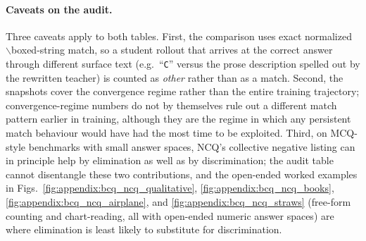 \paragraph{Caveats on the audit.} Three caveats apply to both tables. First, the comparison uses exact normalized $\backslash$boxed-string match, so a student rollout that arrives at the correct answer through different surface text (e.g.\ ``\texttt{C}'' versus the prose description spelled out by the rewritten teacher) is counted as \emph{other} rather than as a match. Second, the snapshots cover the convergence regime rather than the entire training trajectory; convergence-regime numbers do not by themselves rule out a different match pattern earlier in training, although they are the regime in which any persistent match behaviour would have had the most time to be exploited. Third, on MCQ-style benchmarks with small answer spaces, NCQ's collective negative listing can in principle help by elimination as well as by discrimination; the audit table cannot disentangle these two contributions, and the open-ended worked examples in Figs.~\ref{fig:appendix:bcq_ncq_qualitative}, \ref{fig:appendix:bcq_ncq_books}, \ref{fig:appendix:bcq_ncq_airplane}, and \ref{fig:appendix:bcq_ncq_straws} (free-form counting and chart-reading, all with open-ended numeric answer spaces) are where elimination is least likely to substitute for discrimination.




